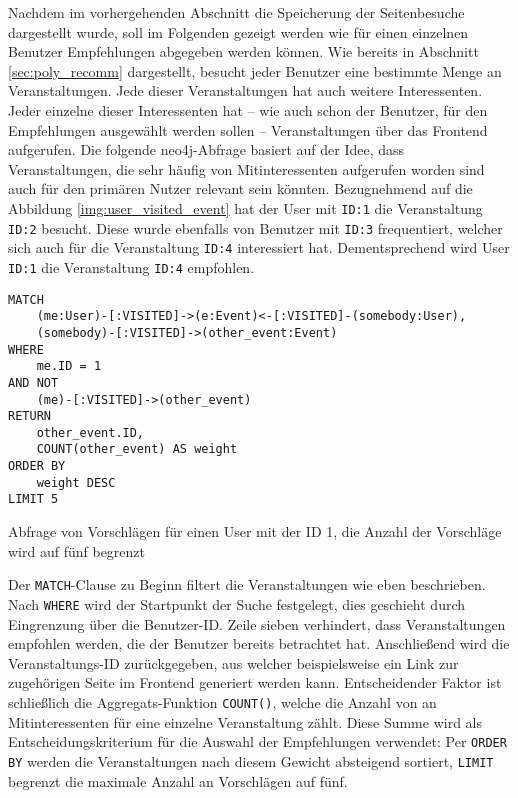 Nachdem im vorhergehenden Abschnitt die Speicherung der Seitenbesuche dargestellt wurde, soll im Folgenden gezeigt werden wie für einen einzelnen Benutzer Empfehlungen abgegeben werden können. Wie bereits in Abschnitt \ref{sec:poly_recomm} dargestellt, besucht jeder Benutzer eine bestimmte Menge an Veranstaltungen. Jede dieser Veranstaltungen hat auch weitere Interessenten. Jeder einzelne dieser Interessenten hat -- wie auch schon der Benutzer, für den Empfehlungen ausgewählt werden sollen -- Veranstaltungen über das Frontend aufgerufen. Die folgende neo4j-Abfrage basiert auf der Idee, dass Veranstaltungen, die sehr häufig von Mitinteressenten aufgerufen worden sind auch für den primären Nutzer relevant sein könnten. Bezugnehmend auf die Abbildung \ref{img:user_visited_event} hat der User mit \texttt{ID:1} die Veranstaltung \texttt{ID:2} besucht. Diese wurde ebenfalls von Benutzer mit \texttt{ID:3} frequentiert, welcher sich auch für die Veranstaltung \texttt{ID:4} interessiert hat. Dementsprechend wird User \texttt{ID:1} die Veranstaltung \texttt{ID:4} empfohlen.


\begin{listing}[ht!]
\begin{margincap}
\begin{verbatim}
MATCH
    (me:User)-[:VISITED]->(e:Event)<-[:VISITED]-(somebody:User),
    (somebody)-[:VISITED]->(other_event:Event)
WHERE
    me.ID = 1
AND NOT
    (me)-[:VISITED]->(other_event)
RETURN
    other_event.ID,
    COUNT(other_event) AS weight
ORDER BY
    weight DESC
LIMIT 5
\end{verbatim}
\caption{Abfrage von Vorschlägen für einen User mit der ID 1, die Anzahl der Vorschläge wird auf fünf begrenzt}
\label{lst:cypher_recomm}
\end{margincap}
\end{listing}

Der \texttt{MATCH}-Clause zu Beginn filtert die Veranstaltungen wie eben beschrieben. Nach \texttt{WHERE} wird der Startpunkt der Suche festgelegt, dies geschieht durch Eingrenzung über die Benutzer-ID. Zeile sieben verhindert, dass Veranstaltungen empfohlen werden, die der Benutzer bereits betrachtet hat. Anschließend wird die Veranstaltungs-ID zurückgegeben, aus welcher beispielsweise ein Link zur zugehörigen Seite im Frontend generiert werden kann. Entscheidender Faktor ist schließlich die Aggregats-Funktion \texttt{COUNT()}, welche die Anzahl von an Mitinteressenten für eine einzelne Veranstaltung zählt. Diese Summe wird als Entscheidungskriterium für die Auswahl der Empfehlungen verwendet: Per \texttt{ORDER BY} werden die Veranstaltungen nach diesem Gewicht absteigend sortiert, \texttt{LIMIT} begrenzt die maximale Anzahl an Vorschlägen auf fünf.

